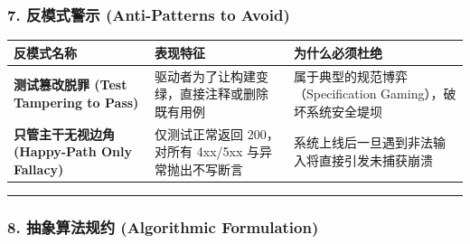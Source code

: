 \subsubsection{7. 反模式警示 (Anti-Patterns to
Avoid)}\label{ux53cdux6a21ux5f0fux8b66ux793a-anti-patterns-to-avoid-7}

{\def\LTcaptype{} %
\begin{longtable}[]{@{}
  >{\raggedright\arraybackslash}p{}
  >{\raggedright\arraybackslash}p{}
  >{\raggedright\arraybackslash}p{}@{}}
\toprule\noalign{}
\begin{minipage}[b]{\linewidth}\raggedright
反模式名称
\end{minipage} & \begin{minipage}[b]{\linewidth}\raggedright
表现特征
\end{minipage} & \begin{minipage}[b]{\linewidth}\raggedright
为什么必须杜绝
\end{minipage} \\
\midrule\noalign{}
\endhead
\bottomrule\noalign{}
\endlastfoot
\textbf{测试篡改脱罪 (Test Tampering to Pass)} &
驱动者为了让构建变绿，直接注释或删除既有用例 &
属于典型的规范博弈（Specification Gaming），破坏系统安全堤坝 \\
\textbf{只管主干无视边角 (Happy-Path Only Fallacy)} & 仅测试正常返回
200，对所有 4xx/5xx 与异常抛出不写断言 &
系统上线后一旦遇到非法输入将直接引发未捕获崩溃 \\
\end{longtable}
}

\begin{center}\rule{0.5\linewidth}{0.5pt}\end{center}

\subsubsection{8. 抽象算法规约 (Algorithmic
Formulation)}\label{ux62bdux8c61ux7b97ux6cd5ux89c4ux7ea6-algorithmic-formulation-6}

